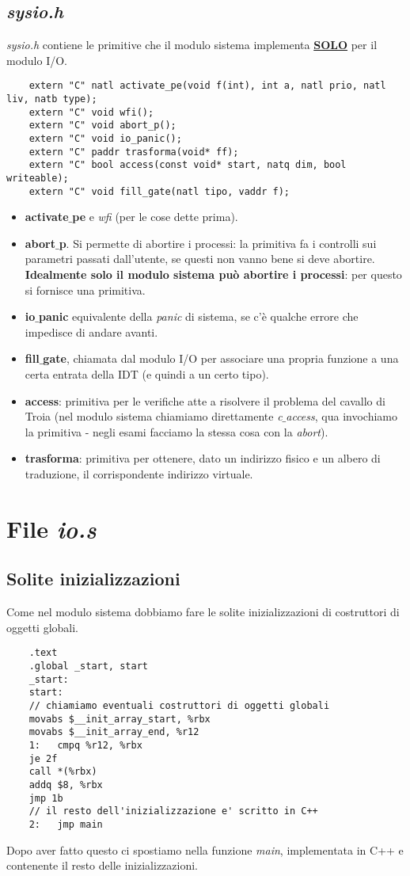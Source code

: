 \subsection{\emph{sysio.h}}
\emph{sysio.h} contiene le primitive che il modulo sistema implementa \textbf{\underline{SOLO}} per il modulo I/O. 
\small
\begin{verbatim}
	extern "C" natl activate_pe(void f(int), int a, natl prio, natl liv, natb type);
	extern "C" void wfi();
	extern "C" void abort_p();
	extern "C" void io_panic();
	extern "C" paddr trasforma(void* ff);
	extern "C" bool access(const void* start, natq dim, bool writeable);
	extern "C" void fill_gate(natl tipo, vaddr f);
\end{verbatim}
\normalsize 
\begin{itemize}
	\item \textbf{activate$\_$pe} e \emph{wfi} (per le cose dette prima).
	\item \textbf{abort$\_$p}. Si permette di abortire i processi: la primitiva fa i controlli sui parametri passati dall'utente, se questi non vanno bene si deve abortire. \textbf{Idealmente solo il modulo sistema può abortire i processi}: per questo si fornisce una primitiva.
	\item \textbf{io$\_$panic} equivalente della \emph{panic} di sistema, se c'è qualche errore che impedisce di andare avanti.
	
	\item \textbf{fill$\_$gate}, chiamata dal modulo I/O per associare una propria funzione a una certa entrata della IDT (e quindi a un certo tipo).
	
	\item \textbf{access}: primitiva per le verifiche atte a risolvere il problema del cavallo di Troia (nel modulo sistema chiamiamo direttamente \emph{c$\_$access}, qua invochiamo la primitiva - negli esami facciamo la stessa cosa con la \emph{abort}).
	
	\item \textbf{trasforma}: primitiva per ottenere, dato un indirizzo fisico e un albero di traduzione, il corrispondente indirizzo virtuale.
\end{itemize}  

\section{File \emph{io.s}}
\subsection{Solite inizializzazioni} 
Come nel modulo sistema dobbiamo fare le solite inizializzazioni di costruttori di oggetti globali.
\small
\begin{verbatim}
	.text
	.global _start, start
	_start:
	start:
	// chiamiamo eventuali costruttori di oggetti globali
	movabs $__init_array_start, %rbx
	movabs $__init_array_end, %r12
	1:	 cmpq %r12, %rbx
	je 2f
	call *(%rbx)
	addq $8, %rbx
	jmp 1b
	// il resto dell'inizializzazione e' scritto in C++
	2:	 jmp main
\end{verbatim}
\normalsize 
Dopo aver fatto questo ci spostiamo nella funzione \emph{main}, implementata in C++ e contenente il resto delle inizializzazioni.
